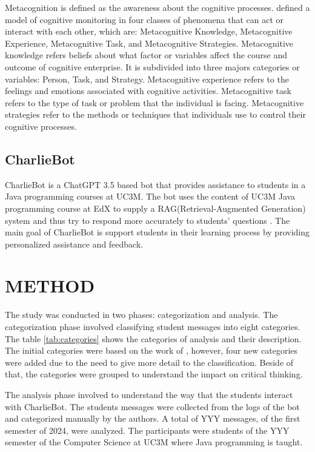 \documentclass[a4paper,twoside]{article}
\begin{document}
Metacognition is defined as the awareness about the cognitive processes.
\cite{flavell79} defined a model of cognitive monitoring in four classes of
phenomena that can act or interact with each other, which are: Metacognitive
Knowledge, Metacognitive Experience, Metacognitive Task, and Metacognitive
Strategies. Metacognitive knowledge refers beliefs about what factor or
variables affect the course and outcome of cognitive enterprise. It is
subdivided into three majors categories or variables: Person, Task, and
Strategy. Metacognitive experience refers to the feelings and emotions
associated with cognitive activities. Metacognitive task refers to the type of
task or problem that the individual is facing. Metacognitive strategies refer to
the methods or techniques that individuals use to control their cognitive
processes.


\subsection{CharlieBot}

CharlieBot is a ChatGPT 3.5 based bot that provides assistance to students in a
Java programming courses at UC3M. The bot uses the content of UC3M Java
programming course at EdX to supply a RAG(Retrieval-Augmented Generation) system
and thus try to respond more accurately to students' questions \cite{Sun24}. The
main goal of CharlieBot is support students in their learning process by
providing personalized assistance and feedback.

\section{\uppercase{Method}}

The study was conducted in two phases: categorization and analysis. The
categorization phase involved classifying student messages into eight
categories. The table \ref{tab:categories} shows the categories of analysis and
their description. The initial categories were based on the work of
\cite{Ghimire24}, however, four new categories were added due to the need to
give more detail to the classification. Beside of that, the categories were
grouped to understand the impact on critical thinking.

The analysis phase involved to understand the way that the students interact
with CharlieBot. The students messages were collected from the logs of the bot
and categorized manually by the authors. A total of YYY messages, of the first
semester of 2024, were analyzed. The participants were students of the YYY
semester of the Computer Science at UC3M where Java programming is taught.
\end{document}

